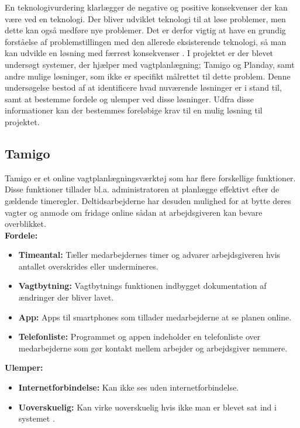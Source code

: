 En teknologivurdering klarlægger de negative og positive konsekvenser der kan være ved en teknologi. Der bliver udviklet teknologi til at løse problemer, men dette kan også medføre nye problemer. Det er derfor vigtig at have en grundig forståelse af problemstillingen med den allerede eksisterende teknologi, så man kan udvikle en løsning med færrest konsekvenser \citep{ProTek}.
I projektet er der blevet undersøgt systemer, der hjælper med vagtplanlægning; Tamigo og Planday, samt andre mulige løsninger, som ikke er specifikt målrettet til dette problem. Denne undersøgelse bestod af at identificere hvad nuværende løsninger er i stand til, samt at bestemme fordele og ulemper ved disse løsninger. Udfra disse informationer kan der bestemmes foreløbige krav til en mulig løsning til projektet.

\subsection{Tamigo}
Tamigo er et online vagtplanlægningsværktøj som har flere forskellige funktioner. Disse funktioner tillader bl.a. administratoren at planlægge effektivt efter de gældende timeregler. Deltidsarbejderne har desuden mulighed for at bytte deres vagter og anmode om fridage online sådan at arbejdsgiveren kan bevare overblikket.\\

\textbf{Fordele: }
\begin{itemize}
\item {\textbf{Timeantal:} Tæller medarbejdernes timer og advarer arbejdsgiveren hvis antallet overskrides eller undermineres.}
\item {\textbf{Vagtbytning:} Vagtbytnings funktionen indbygget dokumentation af ændringer der bliver lavet.}
\item {\textbf{App:} Apps til smartphones som tillader medarbejderne at se planen online.}
\item {\textbf{Telefonliste:} Programmet og appen indeholder en telefonliste over medarbejderne som gør kontakt mellem arbejder og arbejdsgiver nemmere.}\\
\end{itemize}

\textbf{Ulemper: }
\begin{itemize}
\item {\textbf{Internetforbindelse:} Kan ikke ses uden internetforbindelse.}
\item {\textbf{Uoverskuelig:} Kan virke uoverskuelig hvis ikke man er blevet sat ind i systemet \citep{Tamigo, Trustpilot}.}
\end{itemize}

